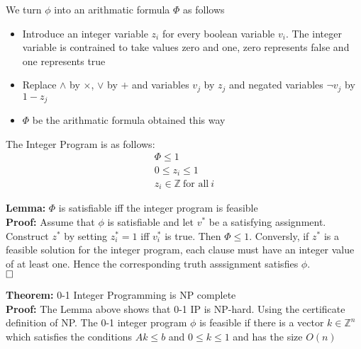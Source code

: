 \documentclass[mathserif]{beamer}
\renewcommand{\qed}{\hfill\square}
\begin{document}
\begin{frame}
We turn $\phi$ into an arithmatic formula $\Phi$ as follows
\begin{itemize}
\item Introduce an integer variable $z_i$ for every boolean variable $v_i$. The integer variable is contrained to take values zero and one, zero represents false and one represents true
\item Replace $\wedge$ by $\times$, $\vee$ by $+$ and variables $v_j$ by $z_j$
and negated variables $\neg v_j$ by $1 - z_j$
\item $\Phi$ be the arithmatic formula obtained this way
\end{itemize}
\end{frame}

\begin{frame}
The Integer Program is as follows:
\begin{align*}
\Phi \leq 1\\
0 \leq z_i \leq 1\\
z_i \in \mathbb{Z}\ \text{for all}\ i
\end{align*}

\textbf{Lemma:} $\Phi$ is satisfiable iff the integer program is feasible\\
\textbf{Proof:} Assume that $\phi$ is satisfiable and let $v^*$ be a satisfying
assignment. Construct $z^*$ by setting $z^*_i = 1$ iff $v^*_i$ is true. Then
$\Phi \leq 1$.
Conversly, if $z^*$ is a feasible solution for the integer program, each clause
must have an integer value of at least one. Hence the corresponding truth
asssignment satisfies $\phi$.\\
$\qed$
\end{frame}

\begin{frame}

\textbf{Theorem:} 0-1 Integer Programming is NP complete\\
\textbf{Proof:} The Lemma above shows that 0-1 IP is NP-hard. Using the certificate
definition of NP. The 0-1 integer program $\phi$ is feasible if there is a
vector $k \in \mathbb{Z}^n$ which satisfies the conditions $Ak \leq b$ and $0
\leq k \leq 1$ and has the size $O(n)$
\end{frame}
\end{document}
